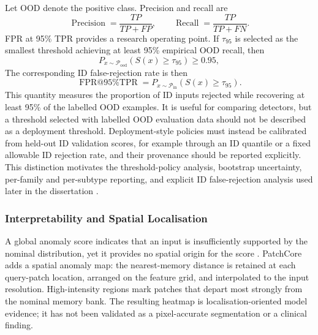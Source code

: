\documentclass[fleqn,12pt]{olplainarticle}
\begin{document}
Let OOD denote the positive class. Precision and recall are
\begin{equation}
    \operatorname{Precision}=\frac{TP}{TP+FP},
    \qquad
    \operatorname{Recall}=\frac{TP}{TP+FN}.
\end{equation}
FPR at 95\% TPR provides a research operating point. If $\tau_{95}$ is selected as the smallest threshold achieving at least 95\% empirical OOD recall, then
\begin{equation}
    P_{x\sim\mathcal{P}_{\mathrm{ood}}}
    \left(S(x)\geq\tau_{95}\right)\geq 0.95,
\end{equation}
The corresponding ID false-rejection rate is then
\begin{equation}
    \operatorname{FPR@95\%TPR}=
    P_{x\sim\mathcal{P}_{\mathrm{in}}}
    \left(S(x)\geq\tau_{95}\right).
    \label{eq:fpr95}
\end{equation}
This quantity measures the proportion of ID inputs rejected while recovering at
least 95\% of the labelled OOD examples. It is useful for comparing detectors,
but a threshold selected with labelled OOD evaluation data should not be
described as a deployment threshold. Deployment-style policies must instead be
calibrated from held-out ID validation scores, for example through an ID
quantile or a fixed allowable ID rejection rate, and their provenance should
be reported explicitly. This distinction motivates the threshold-policy
analysis, bootstrap uncertainty, per-family and per-subtype reporting, and
explicit ID false-rejection analysis used later in the dissertation
\cite{yang2022openood,zhang2023openood}.

\subsubsection{Interpretability and Spatial Localisation}

A global anomaly score indicates that an input is insufficiently supported by
the nominal distribution, yet it provides no spatial origin for the score
\cite{choi2023concept}. PatchCore adds a spatial anomaly map: the nearest-memory
distance is retained at each query-patch location, arranged on the feature
grid, and interpolated to the input resolution. High-intensity regions mark
patches that depart most strongly from the nominal memory bank. The resulting
heatmap is localisation-oriented model evidence; it has not been validated as
a pixel-accurate segmentation or a clinical finding.
\end{document}
